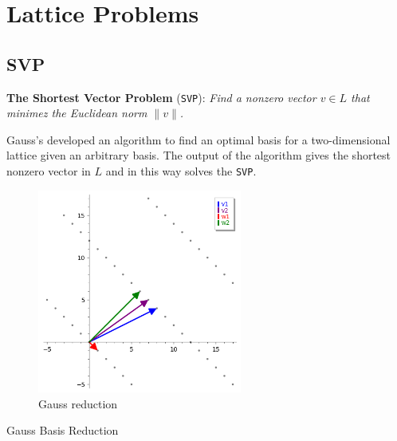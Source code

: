 \documentclass[a4paper,12pt]{report}
\begin{document}
\clearpage

\section{Lattice Problems}

\subsection{SVP}

\textbf{The Shortest Vector Problem} (\texttt{SVP}): \textit{Find a nonzero vector $v \in L$ that minimez the Euclidean norm $\lVert v \rVert$.}

Gauss's developed an algorithm to find an optimal basis for a two-dimensional lattice given an arbitrary basis. The output of the algorithm
gives the shortest nonzero vector in $L$ and in this way solves the \texttt{SVP}.

\begin{figure}[!b]
    \centering
    \includegraphics[width=0.6\textwidth]{./img/gauss_svp.png}
    \caption{Gauss reduction}
    \label{fig:gauss_svp}
\end{figure}

\begin{algorithm}[H]
    \vspace*{5px}
    \caption{Gauss Basis Reduction}
\end{algorithm}
\end{document}

